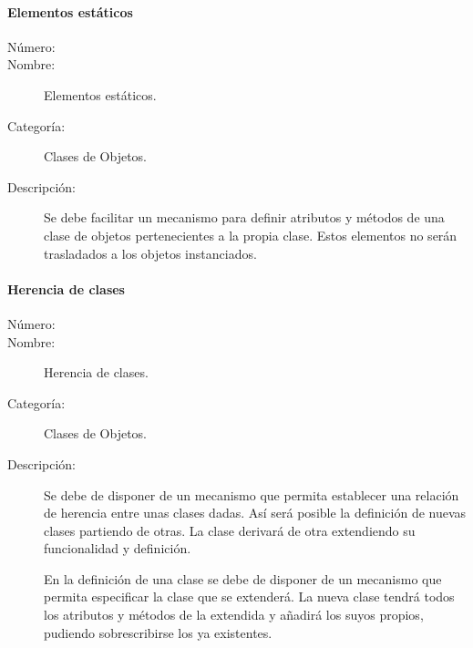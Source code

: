 \paragraph{Elementos estáticos}
\begin{framed}
	\begin{description}
		\item [Número:] \cn
		\item [Nombre:] Elementos estáticos.
		\item [Categoría:] Clases de Objetos.
		\item [Descripción:] Se debe facilitar un mecanismo para definir atributos y métodos de una clase de objetos pertenecientes
      a la propia clase. Estos elementos no serán trasladados a los objetos instanciados.
	\end{description}
\end{framed}

\paragraph{Herencia de clases}
\begin{framed}
	\begin{description}
		\item [Número:] \cn
		\item [Nombre:] Herencia de clases.
		\item [Categoría:] Clases de Objetos.
		\item [Descripción:] Se debe de disponer de un mecanismo que permita establecer una relación de herencia entre unas clases dadas. 
		Así será posible la definición de nuevas clases partiendo de otras. La clase derivará de otra extendiendo su funcionalidad y definición. 
		
		En la definición de una clase se debe de disponer de un mecanismo que permita especificar la clase que se extenderá. La nueva clase tendrá todos 
		los atributos y métodos de la extendida y añadirá los suyos propios, pudiendo sobrescribirse los ya existentes.
	\end{description}
\end{framed}

